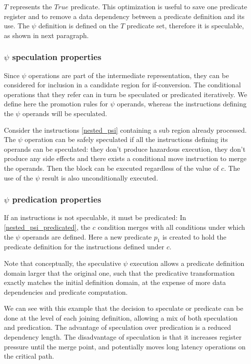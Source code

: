 $T$ represents the $True$ predicate. This optimization is useful to save one predicate register and to remove a data dependency between a predicate definition and its use. 
The $\psi$ definition is defined on the $T$ predicate set, therefore it is speculable, as shown in next paragraph.

\subsubsection{$\psi$ speculation properties}

Since $\psi$ operations are part of the intermediate representation, they can be considered for inclusion in a candidate region for if-conversion. The conditional operations that they refer can in turn be speculated or predicated iteratively. We define here the promotion rules for $\psi$ operands, whereas the instructions defining the $\psi$ operands will be speculated.

Consider the instructions \ref{nested_psi} containing a sub region already processed. The $\psi$ operation can be safely speculated if all the instructions defining its operands can be speculated: they don't produce hazardous execution, they don't produce any side effects and there exists a conditional move instruction to merge the operands. Then the block can be executed regardless of the value of $c$. The use of the $\psi$ result is also unconditionally executed.

\subsubsection{$\psi$ predication properties}

If an instructions is not speculable, it must be predicated:
In \ref{nested_psi_predicated}, the $c$ condition merges with all conditions under which the $\psi$ operands are defined. Here a new predicate $p_1$ is created to hold the predicate definition for the instructions defined under $c$. 

Note that conceptually, the speculative $\psi$ execution allows a predicate definition domain larger that the original one, such that the predicative transformation exactly matches the initial definition domain, at the expense of more data dependencies and predicate computation.

We can see with this example that the decision to speculate or predicate can be done at the level of each joining definition, allowing a mix of both speculation and predication. The advantage of speculation over predication is a reduced dependency length. The disadvantage of speculation is that it increases register pressure until the merge point, and potentially moves long latency operations on the critical path.
 
